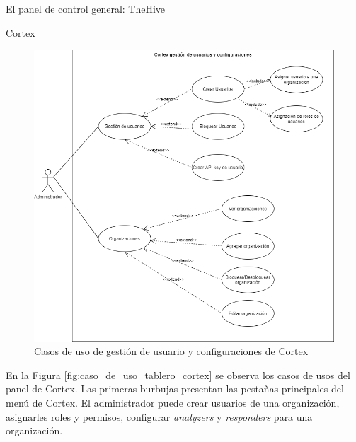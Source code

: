 \begin{section}{El panel de control general: TheHive }
\begin{subsection}{Cortex}
     \begin{figure}[H]
        \centering
        \includegraphics[width=1\textwidth]{./descripcion_sonion_imagenes/figura_30_cortex_user_conf.png}
        \caption{Casos de uso de gestión de usuario y configuraciones de Cortex}
        \label{fig:caso_de_uso_gestion_usuarios_configuraciones_cortex}
     \end{figure}
     \FloatBarrier
     En la Figura \ref{fig:caso_de_uso_tablero_cortex} se observa los casos de usos del panel de Cortex. Las primeras burbujas presentan las pestañas principales del menú de Cortex. El administrador puede crear usuarios de una organización, asignarles roles y permisos, configurar \textit{analyzers} y \textit{responders} para una organización.
     \begin{figure}[H]
      \centering

\end{figure}
\end{subsection}
\end{section}
